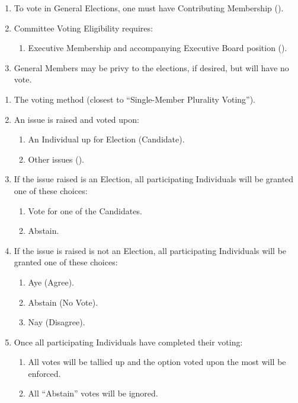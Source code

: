 
\begin{enumerate}
	\item To vote in General Elections, one must have Contributing Membership ().

	\item Committee Voting Eligibility requires:
		\begin{enumerate}
			\item Executive Membership and accompanying Executive Board position ().
		\end{enumerate}

	\item General Members may be privy to the elections, if desired, but will have
		no vote.
\end{enumerate}

\begin{enumerate}
	\item The voting method (closest to ``Single-Member Plurality Voting'').

	\item An issue is raised and voted upon:
		\begin{enumerate}
			\item An Individual up for Election (Candidate).

			\item Other issues ().
		\end{enumerate}

	\item If the issue raised is an Election, all participating Individuals will
		be granted one of these choices:
		\begin{enumerate}
			\item Vote for one of the Candidates.

			\item Abstain.
		\end{enumerate}

	\item If the issue is raised is not an Election, all participating Individuals
		will be granted one of these choices:
		\begin{enumerate}
			\item Aye (Agree).

			\item Abstain (No Vote).

			\item Nay (Disagree).
		\end{enumerate}

	\item Once all participating Individuals have completed their voting:
		\begin{enumerate}
			\item All votes will be tallied up and the option voted upon the most will
				be enforced.

			\item All ``Abstain'' votes will be ignored.
		\end{enumerate}
\end{enumerate}

